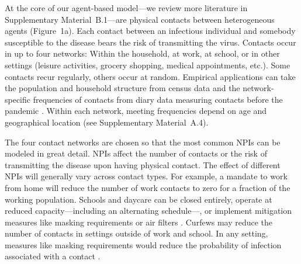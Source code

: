 \documentclass[fleqn,10pt]{wlscirep}
\begin{document}
At the core of our agent-based model\cite{Aleta2020,Hinch2021a}---we review more
literature in Supplementary Material~B.1---are physical contacts between heterogeneous
agents (Figure~1a). Each contact between an infectious individual and somebody
susceptible to the disease bears the risk of transmitting the virus. Contacts occur in
up to four networks: Within the household, at work, at school, or in other settings
(leisure activities, grocery shopping, medical appointments, etc.). Some contacts recur
regularly, others occur at random. Empirical applications can take the population and
household structure from census data and the network-specific frequencies of contacts
from diary data measuring contacts before the pandemic \cite{Mossong2008,Hoang2019}.
Within each network, meeting frequencies depend on age and geographical location (see
Supplementary Material~A.4).

The four contact networks are chosen so that the most common NPIs can be modeled in
great detail. NPIs affect the number of contacts or the risk of transmitting the disease
upon having physical contact. The effect of different NPIs will generally vary across
contact types. For example, a mandate to work from home will reduce the number of work
contacts to zero for a fraction of the working population. Schools and daycare can be
closed entirely, operate at reduced capacity---including an alternating schedule---, or
implement mitigation measures like masking requirements or air filters
\cite{Lessler2021}. Curfews may reduce the number of contacts in settings outside of
work and school. In any setting, measures like masking requirements would reduce the
probability of infection associated with a contact \cite{Cheng2021}.
\end{document}
